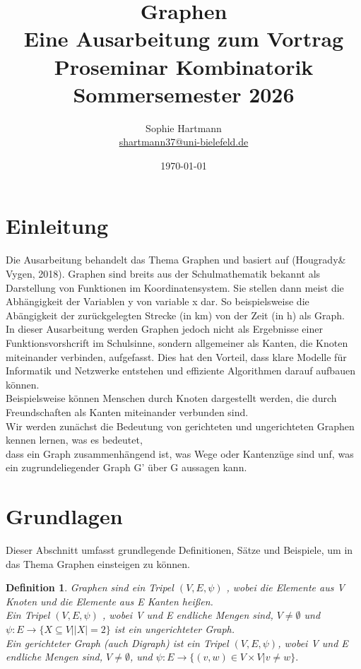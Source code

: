 \documentclass{article}
\title{Graphen \\ [0.5em] \Large Eine Ausarbeitung zum Vortrag \\ Proseminar Kombinatorik \\ Sommersemester 2026}
\date{\today}
\author{Sophie Hartmann \\ \url{shartmann37@uni-bielefeld.de}}
\newtheorem{definition}[satz]{Definition}
\begin{document}
\sloppy


\maketitle
\thispagestyle{empty}
\newpage

\tableofcontents
\newpage



\section{Einleitung}
  Die Ausarbeitung behandelt das Thema Graphen und basiert auf (Hougrady& Vygen, 2018). 
  Graphen sind breits aus der Schulmathematik bekannt als Darstellung von Funktionen im Koordinatensystem.
  Sie stellen dann meist die Abhängigkeit der Variablen y von variable x dar.
  So beispielsweise die Abängigkeit der zurückgelegten Strecke (in km) von der Zeit (in h) als Graph.\\
  In dieser Ausarbeitung werden Graphen jedoch nicht als Ergebnisse einer Funktionsvorshcrift im Schulsinne, sondern allgemeiner als Kanten, die Knoten miteinander verbinden, aufgefasst.
  Dies hat den Vorteil, dass klare Modelle für Informatik und Netzwerke entstehen und effiziente Algorithmen darauf aufbauen können.\\
  Beispielsweise können Menschen durch Knoten dargestellt werden, die durch Freundschaften als Kanten miteinander verbunden sind.\\
  Wir werden zunächst die Bedeutung von gerichteten und ungerichteten Graphen kennen lernen, was es bedeutet,\\
  dass ein Graph zusammenhängend ist, was Wege oder Kantenzüge sind unf, was ein zugrundeliegender Graph G' über G aussagen kann. 
    
  \vspace{\baselineskip}
\newpage

\section{Grundlagen}
  Dieser Abschnitt umfasst grundlegende Definitionen, Sätze und Beispiele, um in das Thema Graphen einsteigen zu können. 

  \begin{definition} 
    Graphen sind ein Tripel $(V,E,\psi)$ , wobei die Elemente aus V Knoten und die Elemente aus E Kanten heißen.\\
    Ein Tripel $(V,E,\psi)$ , wobei V und E endliche Mengen sind,
    $V \neq \emptyset$  und $\psi : E\rightarrow \{X \subseteq  V| |X|=2\}$
    ist ein ungerichteter Graph.\\
    Ein gerichteter Graph (auch Digraph) ist ein Tripel $(V, E, \psi)$, wobei V und E endliche Mengen sind, 
    $V\neq \emptyset$, und $\psi: E\rightarrow \{(v,w)\in V\times V| v\neq w\}.$\\
  \end {definition}
  \vspace{\baselineskip}
\end{document}
